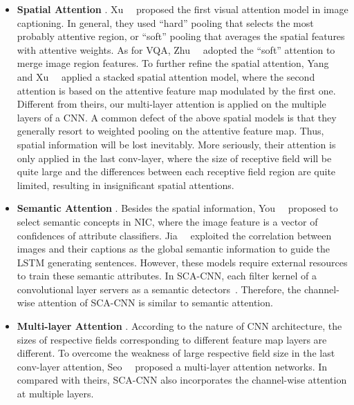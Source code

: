 \documentclass[10pt,twocolumn,letterpaper]{article}
\begin{document}
\leftmargini=3.5mm
\begin{itemize}
     \item{\textbf{Spatial Attention}} . Xu~\etal~\cite{xu2015show} proposed the first visual attention model in image captioning. In general, they used
         ``hard'' pooling that selects the most probably attentive region, or ``soft'' pooling that averages the spatial features with attentive weights. As
         for VQA, Zhu~\etal~\cite{zhu2015visual7w} adopted the ``soft'' attention to merge image region features. To further refine the spatial attention,
         Yang~\etal~\cite{yang2015stacked} and Xu~\etal~\cite{xu2015ask} applied a stacked spatial attention model, where the second attention is based on
         the attentive feature map modulated by the first one. Different from theirs, our multi-layer attention is applied on the multiple layers of a CNN.
         A common defect of the above spatial models is that they generally resort to weighted pooling on the attentive feature map. Thus, spatial
         information will be lost inevitably. More seriously, their attention is only applied in the last conv-layer, where the size of receptive field will
         be quite large and the differences between each receptive field region are quite limited, resulting in insignificant spatial attentions.

\item{\textbf{Semantic Attention}} . Besides the spatial information, You~\etal~\cite{you2016image} proposed to select semantic concepts in NIC, where
        the image feature is a vector of confidences of attribute classifiers. Jia~\etal~\cite{jia2015guiding} exploited the correlation between images and
        their captions as the global semantic information to guide the LSTM generating sentences. However, these models require external resources to train
        these semantic attributes. In SCA-CNN, each filter kernel of a convolutional layer servers as a semantic detectors~\cite{zeiler2014visualizing}.
        Therefore, the channel-wise attention of SCA-CNN is similar to semantic attention.

\item{\textbf{Multi-layer Attention}} . According to the nature of CNN architecture, the sizes of respective fields corresponding to different feature
        map layers are different. To overcome the weakness of large respective field size in the last conv-layer attention,
        Seo~\etal~\cite{seo2016hierarchical} proposed a multi-layer attention networks. In compared with theirs, SCA-CNN also incorporates the channel-wise
        attention at multiple layers.


\end{itemize}
\end{document}
